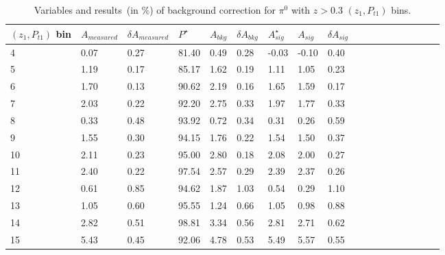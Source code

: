 \begin{table}[H]\footnotesize
\centering
\begin{tabular}{|l|l|l|l|l|l|l|l|l|l|l|l|l|l|l|l|l|l|}
\\ \hline
$(z_{1},P_{t1})$ bin & $A_{measured}$ & $\delta A_{measured}$ & $P^{\star}$ & $A_{bkg}$ & $\delta A_{bkg}$ & $A_{sig}^{\star}$ & $ A_{sig}$  & $\delta A_{sig}$ \\ \hline
4 & 0.07 & 0.27 & 81.40 & 0.49 & 0.28 & -0.03 & -0.10 & 0.40 \\ \hline 
5 & 1.19 & 0.17 & 85.17 & 1.62 & 0.19 & 1.11 & 1.05 & 0.23 \\ \hline 
6 & 1.70 & 0.13 & 90.62 & 2.19 & 0.16 & 1.65 & 1.59 & 0.17 \\ \hline 
7 & 2.03 & 0.22 & 92.20 & 2.75 & 0.33 & 1.97 & 1.77 & 0.33 \\ \hline 
8 & 0.33 & 0.48 & 93.92 & 0.72 & 0.34 & 0.31 & 0.26 & 0.59 \\ \hline 
9 & 1.55 & 0.30 & 94.15 & 1.76 & 0.22 & 1.54 & 1.50 & 0.37 \\ \hline 
10 & 2.11 & 0.23 & 95.00 & 2.80 & 0.18 & 2.08 & 2.00 & 0.27 \\ \hline 
11 & 2.40 & 0.22 & 97.54 & 2.57 & 0.29 & 2.39 & 2.37 & 0.26 \\ \hline 
12 & 0.61 & 0.85 & 94.62 & 1.87 & 1.03 & 0.54 & 0.29 & 1.10 \\ \hline 
13 & 1.05 & 0.60 & 95.55 & 1.24 & 0.66 & 1.05 & 0.98 & 0.88 \\ \hline 
14 & 2.82 & 0.51 & 98.81 & 3.34 & 0.56 & 2.81 & 2.71 & 0.62 \\ \hline 
15 & 5.43 & 0.45 & 92.06 & 4.78 & 0.53 & 5.49 & 5.57 & 0.55 \\ \hline 
\end{tabular}
\caption{Variables and results~(in $\%$) of background correction for $\pi^0$ with $z>0.3$ $(z_1,P_{t1})$ bins.}
\label{tab:etazptbkgcor}
\end{table} 

